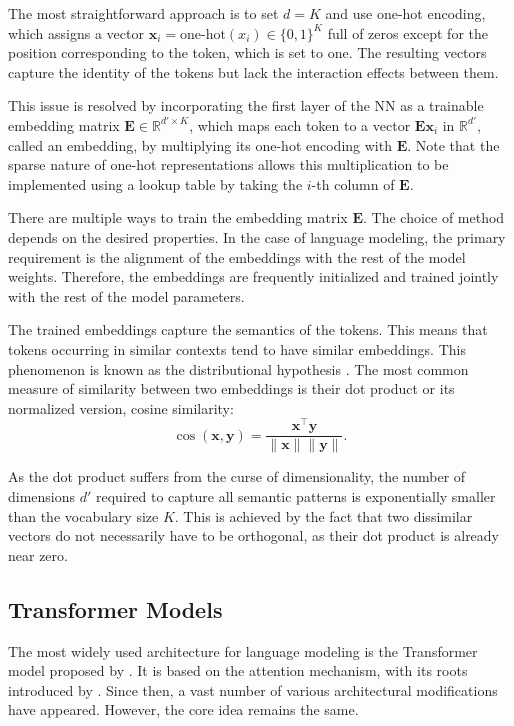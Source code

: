 The most straightforward approach is to set \(d=K\) and use one-hot encoding, which assigns a vector \(\mathbf{x}_i = \textrm{one-hot}(x_i) \in \{0, 1\}^K\) full of zeros except for the position corresponding to the token, which is set to one. The resulting vectors capture the identity of the tokens but lack the interaction effects between them.

This issue is resolved by incorporating the first layer of the NN as a trainable embedding matrix \(\mathbf{E} \in \mathbb{R}^{d' \times K}\), which maps each token to a vector \(\mathbf{Ex}_i\) in \(\mathbb{R}^{d'}\), called an embedding, by multiplying its one-hot encoding with \(\mathbf{E}\). Note that the sparse nature of one-hot representations allows this multiplication to be implemented using a lookup table by taking the \(i\)-th column of \(\mathbf{E}\).

There are multiple ways to train the embedding matrix \(\mathbf{E}\). The choice of method depends on the desired properties. In the case of language modeling, the primary requirement is the alignment of the embeddings with the rest of the model weights. Therefore, the embeddings are frequently initialized and trained jointly with the rest of the model parameters.

The trained embeddings capture the semantics of the tokens. This means that tokens occurring in similar contexts tend to have similar embeddings. This phenomenon is known as the distributional hypothesis \parencite{harris1954}. The most common measure of similarity between two embeddings is their dot product or its normalized version, cosine similarity: %
\begin{equation}
    \cos(\mathbf{x}, \mathbf{y}) = \frac{\mathbf{x}^\top \mathbf{y}}{\|\mathbf{x}\| \|\mathbf{y}\|}.
\end{equation}  

As the dot product suffers from the curse of dimensionality, the number of dimensions \(d'\) required to capture all semantic patterns is exponentially smaller than the vocabulary size \(K\). This is achieved by the fact that two dissimilar vectors do not necessarily have to be orthogonal, as their dot product is already near zero.

\subsection{Transformer Models}

The most widely used architecture for language modeling is the Transformer model proposed by \citet{vaswani2017}. It is based on the attention mechanism, with its roots introduced by \citet{bahdanau2014}. Since then, a vast number of various architectural modifications have appeared. However, the core idea remains the same.

